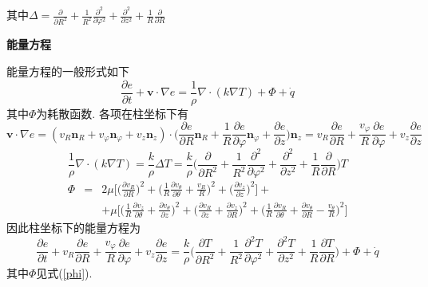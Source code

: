 \begin{solution}
\noindent 其中$\Delta = \frac{\partial}{\partial R^2} +
\frac{1}{R^2}\frac{\partial^2}{\partial\varphi^2}+
\frac{\partial^2}{\partial z^2}+
\frac{1}{R}\frac{\partial}{\partial R}$

\vspace{5pt}
\noindent\textbf{能量方程}
\vspace{5pt}

\noindent 能量方程的一般形式如下
\[
\frac{\partial e}{\partial t} +\mathbf{v}\cdot\nabla e = \frac{1}{\rho}\nabla\cdot(k\nabla T) + \Phi + \dot{q}
\]
其中$\Phi$为耗散函数. 各项在柱坐标下有
\[
\mathbf{v}\cdot\nabla e = (v_R\mathbf{n}_R + v_\varphi\mathbf{n}_\varphi + v_z\mathbf{n}_z)\cdot\Big(\frac{\partial e}{\partial R}\mathbf{n}_R
+ \frac{1}{R}\frac{\partial e}{\partial\varphi}\mathbf{n}_\varphi
+ \frac{\partial e}{\partial z}\Big)\mathbf{n}_z
=
v_R\frac{\partial e}{\partial R}
+ \frac{v_\varphi}{R}\frac{\partial e}{\partial\varphi}
+ v_z\frac{\partial e}{\partial z}
\]
\[
\frac{1}{\rho}\nabla\cdot(k\nabla T) = \frac{k}{\rho}\Delta T= \frac{k}{\rho}
\Big(\frac{\partial}{\partial R^2} +
\frac{1}{R^2}\frac{\partial^2}{\partial\varphi^2}+
\frac{\partial^2}{\partial z^2}+
\frac{1}{R}\frac{\partial}{\partial R}
\Big)T
\]
{\setlength\arraycolsep{2pt}
\begin{eqnarray}\label{phi}
\Phi & = & 2\mu\Big[
\Big(\frac{\partial v_R}{\partial R}\Big)^2 +
\Big(\frac{1}{R}\frac{\partial v_\theta}{\partial\theta} + \frac{v_R}{R}\Big)^2 +
\Big(\frac{\partial v_z}{\partial z}\Big)^2
\Big] + \nonumber\\
& &+\mu\Big[
\Big(\frac{1}{R}\frac{\partial v_z}{\partial\theta} + \frac{\partial v_\theta}{\partial z}\Big)^2 +
\Big(\frac{\partial v_R}{\partial z} + \frac{\partial v_z}{\partial R}\Big)^2 +
\Big(\frac{1}{R}\frac{\partial v_R}{\partial\theta} + \frac{\partial v_\theta}{\partial R}-\frac{v_\theta}{R}\Big)^2
\Big]
\end{eqnarray}}
因此柱坐标下的能量方程为
\[
\frac{\partial e}{\partial t} +v_R\frac{\partial e}{\partial R}
+ \frac{v_\varphi}{R}\frac{\partial e}{\partial\varphi}
+ v_z\frac{\partial e}{\partial z}
= \frac{k}{\rho}
\Big(
\frac{\partial T}{\partial R^2} +
\frac{1}{R^2}\frac{\partial^2 T}{\partial\varphi^2}+
\frac{\partial^2 T}{\partial z^2}+
\frac{1}{R}\frac{\partial T}{\partial R}
\Big) + \Phi + \dot{q}
\]
其中$\Phi$见式(\ref{phi}).
\end{solution} 
